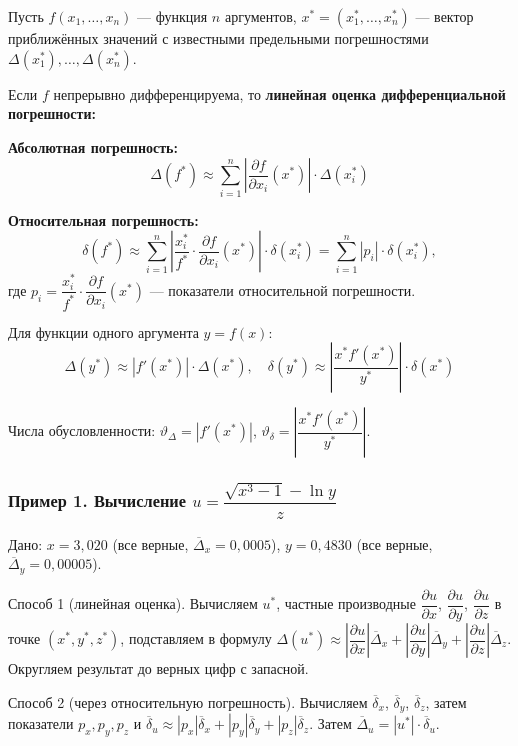 \documentclass[14pt,a4paper]{extarticle}
\begin{document}
Пусть $f(x_1, \ldots, x_n)$ --- функция $n$ аргументов, $x^* = (x_1^*, \ldots, x_n^*)$ --- вектор приближённых значений с известными предельными погрешностями $\Delta(x_1^*), \ldots, \Delta(x_n^*)$.

Если $f$ непрерывно дифференцируема, то \textbf{линейная оценка дифференциальной погрешности:}

\textbf{Абсолютная погрешность:}
\[\Delta(f^*) \approx \sum_{i=1}^{n} \left|\frac{\partial f}{\partial x_i}(x^*)\right| \cdot \Delta(x_i^*)\]

\textbf{Относительная погрешность:}
\[\delta(f^*) \approx \sum_{i=1}^{n} \left|\frac{x_i^*}{f^*} \cdot \frac{\partial f}{\partial x_i}(x^*)\right| \cdot \delta(x_i^*) = \sum_{i=1}^{n} |p_i| \cdot \delta(x_i^*),\]
где $p_i = \dfrac{x_i^*}{f^*} \cdot \dfrac{\partial f}{\partial x_i}(x^*)$ --- показатели относительной погрешности.

Для функции одного аргумента $y = f(x)$:
\[\Delta(y^*) \approx |f'(x^*)| \cdot \Delta(x^*), \quad \delta(y^*) \approx \left|\frac{x^* f'(x^*)}{y^*}\right| \cdot \delta(x^*)\]

Числа обусловленности: $\vartheta_\Delta = |f'(x^*)|$, $\vartheta_\delta = \left|\dfrac{x^* f'(x^*)}{y^*}\right|$.

\subsubsection{Пример 1. Вычисление $u = \dfrac{\sqrt{x^3 - 1} - \ln y}{z}$}

Дано: $x = 3{,}020$ (все верные, $\overline{\Delta}_x = 0{,}0005$), $y = 0{,}4830$ (все верные, $\overline{\Delta}_y = 0{,}00005$).

Способ 1 (линейная оценка). Вычисляем $u^*$, частные производные $\dfrac{\partial u}{\partial x}$, $\dfrac{\partial u}{\partial y}$, $\dfrac{\partial u}{\partial z}$ в точке $(x^*, y^*, z^*)$, подставляем в формулу $\Delta(u^*) \approx \left|\dfrac{\partial u}{\partial x}\right|\overline{\Delta}_x + \left|\dfrac{\partial u}{\partial y}\right|\overline{\Delta}_y + \left|\dfrac{\partial u}{\partial z}\right|\overline{\Delta}_z$. Округляем результат до верных цифр с запасной.

Способ 2 (через относительную погрешность). Вычисляем $\overline{\delta}_x$, $\overline{\delta}_y$, $\overline{\delta}_z$, затем показатели $p_x, p_y, p_z$ и $\overline{\delta}_u \approx |p_x|\overline{\delta}_x + |p_y|\overline{\delta}_y + |p_z|\overline{\delta}_z$. Затем $\overline{\Delta}_u = |u^*| \cdot \overline{\delta}_u$.
\end{document}
